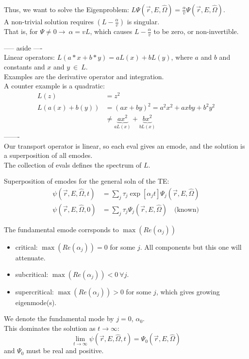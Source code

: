 \documentclass[12pt]{article}
\newcommand{\rvec}{\ensuremath{\vec{r}}}
\newcommand{\vOmega}{\ensuremath{\hat{\Omega}}}
\begin{document}
Thus, we want to solve the Eigenproblem: $L\Psi(\rvec, E, \vOmega) = \frac{\alpha}{v}\Psi(\rvec, E, \vOmega)$.\\
A non-trivial solution requires $(L - \frac{\alpha}{v})$ is singular. \\
That is, for $\Psi \neq 0 \rightarrow \: \alpha = v L$, which causes $L - \frac{\alpha}{v}$ to be zero, or non-invertible.


----- aside ----\\
Linear operators: $L(a*x + b*y) = aL(x) + bL(y)$, where $a$ and $b$ and constants and $x$ and $y \: \in \: L$.\\
Examples are the derivative operator and integration. \\
A counter example is a quadratic:
\begin{align*}
L(z) &= z^2 \\
L(a(x) + b(y)) &= (ax + by)^2 = a^2 x^2 + axby + b^2 y^2 \\
& \neq \underbrace{a x^2}_{aL(x)} + \underbrace{b x^2}_{bL(x)}
\end{align*}
-------\\
Our transport operator is linear, so each eval gives an emode, and the solution is a superposition of all emodes. \\
The collection of evals defines the spectrum of $L$.

Superposition of emodes for the general soln of the TE:
\begin{align*}
\psi(\rvec, E, \vOmega, t) &= \sum_{j} \tau_j \exp[\alpha_j t] \Psi_j(\rvec, E, \vOmega) \\
\psi(\rvec, E, \vOmega, 0) &= \sum_{j} \tau_j \Psi_j(\rvec, E, \vOmega) \quad \text{(known)}
\end{align*}

The fundamental emode corrsponds to $\max(Re(\alpha_j))$
\begin{itemize}
\item critical: $\max(Re(\alpha_j)) = 0$ for some $j$. All components but this one will attenuate. 
\item subcritical: $\max(Re(\alpha_j)) < 0 \: \forall j$.
\item supercritical: $\max(Re(\alpha_j)) > 0$ for some $j$, which gives growing eigenmode(s).
\end{itemize}
We denote the fundamental mode by $j=0$, $\alpha_0$. \\
This dominates the solution as $t \rightarrow \infty$:
\[\lim\limits_{t \to \infty} \psi(\rvec, E, \vOmega, t) = \Psi_0(\rvec, E, \vOmega)\]
and $\Psi_0$ must be real and positive.
\end{document}
